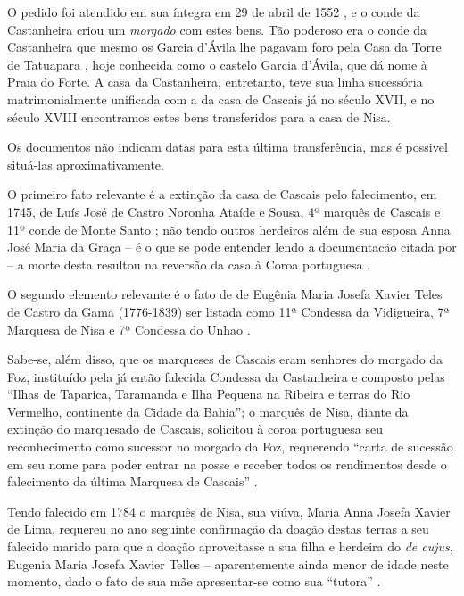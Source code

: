 O pedido foi atendido em sua íntegra em 29 de abril de 1552 \cite[p.~III-3 - III-4]{teixeira_doacoes_1978}, e o conde da Castanheira criou um \textit{morgado} com estes bens. Tão poderoso era o conde da Castanheira que mesmo os Garcia d'Ávila lhe pagavam foro pela Casa da Torre de Tatuapara \cite[p.~III-5]{teixeira_doacoes_1978}, hoje conhecida como o castelo Garcia d'Ávila, que dá nome à Praia do Forte. A casa da Castanheira, entretanto, teve sua linha sucessória matrimonialmente unificada com a da casa de Cascais já no século XVII, e no século XVIII encontramos estes bens transferidos para a casa de Nisa.

Os documentos não indicam datas para esta última transferência, mas é possivel situá-las aproximativamente. 

O primeiro fato relevante é a extinção da casa de Cascais pelo falecimento, em 1745, de Luís José de Castro Noronha Ataíde e Sousa, 4º marquês de Cascais e 11º conde de Monte Santo \cite{wiki_cascais_2015}; não tendo outros herdeiros além de sua esposa Anna José Maria da Graça -- é o que se pode entender lendo a documentacão citada por  -- a morte desta resultou na reversão da casa à Coroa portuguesa \cite{wiki_cascais_2015}. 

O segundo elemento relevante é o fato de de Eugênia Maria Josefa Xavier Teles de Castro da Gama (1776-1839) ser listada como 11ª Condessa da Vidigueira, 7ª Marquesa de Nisa e 7ª Condessa do Unhao \cite{wiki_nisa_2015}. 

Sabe-se, além disso, que os marqueses de Cascais eram senhores do morgado da Foz, instituído pela já então falecida Condessa da Castanheira e composto pelas ``Ilhas de Taparica, Taramanda e Ilha Pequena na Ribeira e terras do Rio Vermelho, continente da Cidade da Bahia''; o marquês de Nisa, diante da extinção do marquesado de Cascais, solicitou à coroa portuguesa seu reconhecimento como sucessor no morgado da Foz, requerendo ``carta de sucessão em seu nome para poder entrar na posse e receber todos os rendimentos desde o falecimento da última Marquesa de Cascais'' \cite[p.~592]{castralmeida_ultramar_1910}. 

Tendo falecido em 1784 o marquês de Nisa, sua viúva, Maria Anna Josefa Xavier de Lima, requereu no ano seguinte confirmação da doação destas terras a seu falecido marido para que a doação aproveitasse a sua filha e herdeira do \textit{de cujus}, Eugenia Maria Josefa Xavier Telles -- aparentemente ainda menor de idade neste momento, dado o fato de sua mãe apresentar-se como sua ``tutora'' \cite[p.~592]{castralmeida_ultramar_1910}. 

